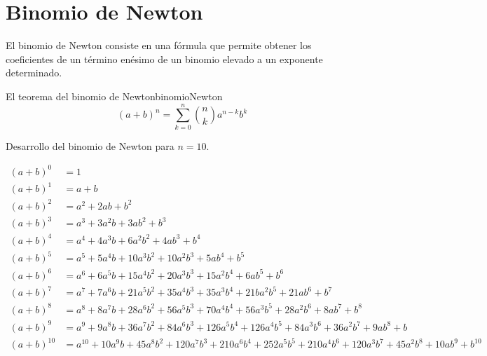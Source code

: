 
\section*{Binomio de Newton}

El binomio de Newton consiste en una fórmula que permite obtener los
coeficientes de un término enésimo de un binomio elevado a un exponente
determinado.


\begin{theorem}{El teorema del binomio de Newton}{binomioNewton}
	\begin{equation}
		(a+b)^n = \sum_{k=0}^{n} \binom{n}{k} a^{n-k} b^k
	\end{equation}
\end{theorem}

Desarrollo del binomio de Newton para $n=10$.

\begin{landscape}
	\begin{equation}
		\begin{array}{lll} 
			(a+b)^0 	& =  1 \\
			(a+b)^1 	& =  a+b \\
			(a+b)^2 	& =  a^2+2ab+b^2 \\
			(a+b)^3 	& =  a^3+3a^2b+3ab^2+b^3 \\
			(a+b)^4 	& =  a^4+4a^3b+6a^2b^2+4ab^3+b^4 \\
			(a+b)^5 	& =  a^5+5a^4b+10a^3b^2+10a^2b^3+5ab^4+b^5\\
			(a+b)^6 	& =  a^6+6a^5b+15a^4b^2+20a^3b^3+15a^2b^4+6ab^5+b^6\\
			(a+b)^7 	& =  a^7+7a^6b+21a^5b^2+35a^4b^3+35a^3b^4+21ba^2b^5+21ab^6+b^7 \\
			(a+b)^8 	& =  a^8+8a^7b+28a^6b^2+56a^5b^3+70a^4b^4+56a^3b^5+28a^2b^6+8ab^7+b^8 \\
			(a+b)^9 	& =  a^9+9a^8b+36a^7b^2+84a^6b^3+126a^5b^4+126a^4b^5+84a^3b^6+36a^2b^7+9ab^8+b \\
			(a+b)^{10} 	& =  a^{10}+10a^9b+45a^8b^2+120a^7b^3+210a^6b^4+252a^5b^5+210a^4b^6+120a^3b^7+45a^2b^8+10ab^9+b^{10} \\
		\end{array}
	\end{equation}
\end{landscape}
